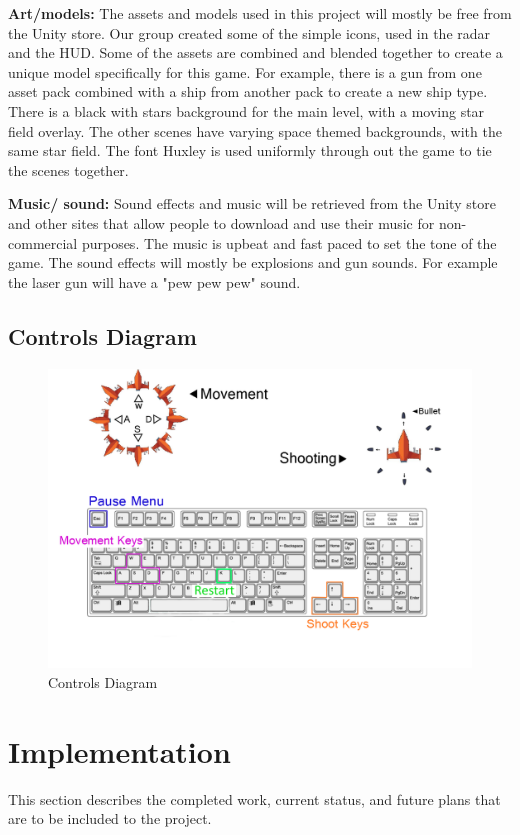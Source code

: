 \documentclass[12pt]{article}       %
\begin{document}
	{\bf Art/models:} The assets and models used in this project will mostly be free from the Unity store. Our group created some of the simple icons, used in the radar and the HUD. Some of the assets are combined and blended together to create a unique model specifically for this game. For example, there is a gun from one asset pack combined with a ship from another pack to create a new ship type. There is a black with stars background for the main level, with a moving star field overlay. The other scenes have varying space themed backgrounds, with the same star field. The font Huxley is used uniformly through out the game to tie the scenes together.  

	{\bf Music/ sound:} Sound effects and music will be retrieved from the Unity store and other sites that allow people to download and use their music for non-commercial purposes. The music is upbeat and fast paced to set the tone of the game. The sound effects will mostly be explosions and gun sounds. For example the laser gun will have a "pew pew pew" sound. 


\subsection{Controls Diagram}

\begin{figure} [H]
\centering
\includegraphics[width=6.3 in]{ControlDiagramFinal.png}
\caption{Controls Diagram} \label{Controls}
\end{figure}


\section{Implementation} %
\label{sec:history}
This section describes the completed work, current status, and future plans that are to be included to the project.
\end{document}

